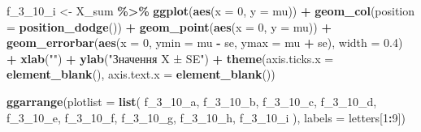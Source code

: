 \documentclass[
  11pt,
]{book}
\newenvironment{Shaded}{\begin{snugshade}}{\end{snugshade}}
\newcommand{\AttributeTok}[1]{\textcolor[rgb]{0.13,0.29,0.53}{#1}}
\newcommand{\DecValTok}[1]{\textcolor[rgb]{0.00,0.00,0.81}{#1}}
\newcommand{\FloatTok}[1]{\textcolor[rgb]{0.00,0.00,0.81}{#1}}
\newcommand{\FunctionTok}[1]{\textcolor[rgb]{0.13,0.29,0.53}{\textbf{#1}}}
\newcommand{\NormalTok}[1]{#1}
\newcommand{\OtherTok}[1]{\textcolor[rgb]{0.56,0.35,0.01}{#1}}
\newcommand{\SpecialCharTok}[1]{\textcolor[rgb]{0.81,0.36,0.00}{\textbf{#1}}}
\newcommand{\StringTok}[1]{\textcolor[rgb]{0.31,0.60,0.02}{#1}}
\begin{document}
\begin{Shaded}
\begin{Highlighting}[]
\NormalTok{f\_3\_10\_i }\OtherTok{\textless{}{-}}\NormalTok{ X\_sum }\SpecialCharTok{\%\textgreater{}\%} 
  \FunctionTok{ggplot}\NormalTok{(}\FunctionTok{aes}\NormalTok{(}\AttributeTok{x =} \DecValTok{0}\NormalTok{, }\AttributeTok{y =}\NormalTok{ mu)) }\SpecialCharTok{+} 
  \FunctionTok{geom\_col}\NormalTok{(}\AttributeTok{position =} \FunctionTok{position\_dodge}\NormalTok{()) }\SpecialCharTok{+}
  \FunctionTok{geom\_point}\NormalTok{(}\FunctionTok{aes}\NormalTok{(}\AttributeTok{x =} \DecValTok{0}\NormalTok{, }\AttributeTok{y =}\NormalTok{ mu)) }\SpecialCharTok{+}
  \FunctionTok{geom\_errorbar}\NormalTok{(}\FunctionTok{aes}\NormalTok{(}\AttributeTok{x =} \DecValTok{0}\NormalTok{, }\AttributeTok{ymin =}\NormalTok{ mu }\SpecialCharTok{{-}}\NormalTok{ se, }\AttributeTok{ymax =}\NormalTok{ mu }\SpecialCharTok{+}\NormalTok{ se), }
                \AttributeTok{width =} \FloatTok{0.4}\NormalTok{) }\SpecialCharTok{+}
  \FunctionTok{xlab}\NormalTok{(}\StringTok{""}\NormalTok{) }\SpecialCharTok{+} \FunctionTok{ylab}\NormalTok{(}\StringTok{"Значення X ± SE"}\NormalTok{) }\SpecialCharTok{+}
  \FunctionTok{theme}\NormalTok{(}\AttributeTok{axis.ticks.x =} \FunctionTok{element\_blank}\NormalTok{(),}
        \AttributeTok{axis.text.x =} \FunctionTok{element\_blank}\NormalTok{())}

\FunctionTok{ggarrange}\NormalTok{(}\AttributeTok{plotlist =} \FunctionTok{list}\NormalTok{(}
\NormalTok{  f\_3\_10\_a, f\_3\_10\_b, f\_3\_10\_c, f\_3\_10\_d, f\_3\_10\_e, f\_3\_10\_f, f\_3\_10\_g, f\_3\_10\_h, f\_3\_10\_i}
\NormalTok{), }\AttributeTok{labels =}\NormalTok{ letters[}\DecValTok{1}\SpecialCharTok{:}\DecValTok{9}\NormalTok{])}
\end{Highlighting}
\end{Shaded}
\end{document}
